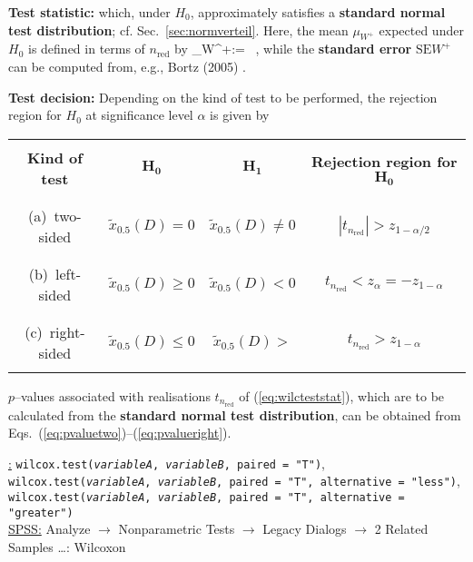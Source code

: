 \medskip
\noindent
\textbf{Test statistic:}
%
\be
{}
\ee
%
which, under $H_{0}$, approximately satisfies a \textbf{standard
normal test distribution}; cf. Sec.~\ref{sec:normverteil}. Here,
the mean $\mu_{W^{+}}$ expected under $H_{0}$ is defined in terms
of $n_\mathrm{red}$ by
%
\be
\mu_{W^{+}}:= \ ,
\ee
%
while the \textbf{standard error} $\text{SE}W^{+}$ can be computed 
from, e.g., Bortz (2005) .

\medskip
\noindent
\textbf{Test decision:} Depending on the kind of test to be 
performed, the rejection region for $H_{0}$ at significance level 
$\alpha$ is given by
%
\begin{center}
\begin{tabular}[h]{c|c|c|c}
 & & & \\
\textbf{Kind of test} & $\boldsymbol{H_{0}}$ &
$\boldsymbol{H_{1}}$ &
\textbf{Rejection region for} $\boldsymbol{H_{0}}$ \\
 & & & \\
\hline
 & & & \\
(a)~two-sided & $\tilde{x}_{0.5}(D) = 0$ & $\tilde{x}_{0.5}(D)
\neq 0$ & $|t_{n_\mathrm{red}}|>z_{1-\alpha/2}$ \\
 & & & \\
\hline
 & & & \\
(b)~left-sided & $\tilde{x}_{0.5}(D) \geq 0$ & $\tilde{x}_{0.5}(D)
< 0$ & $t_{n_\mathrm{red}}<z_{\alpha}=-z_{1-\alpha}$ \\
 & & & \\
\hline
 & & & \\
(c)~right-sided & $\tilde{x}_{0.5}(D) \leq 0$ & $\tilde{x}_{0.5}(D)
> $ & $t_{n_\mathrm{red}}>z_{1-\alpha}$ \\
 & & &
\end{tabular}
\end{center}
%
$p$--values associated with realisations $t_{n_\mathrm{red}}$ of 
(\ref{eq:wilcteststat}), which are to be calculated from the
\textbf{standard normal test distribution}, can be obtained from 
Eqs.~(\ref{eq:pvaluetwo})--(\ref{eq:pvalueright}).

\medskip
\noindent
\underline{\R:}
\texttt{wilcox.test(\textit{variableA}, \textit{variableB},
paired = "T")}, \\
\texttt{wilcox.test(\textit{variableA}, \textit{variableB},
paired = "T", alternative = "less")}, \\
\texttt{wilcox.test(\textit{variableA}, \textit{variableB},
paired = "T", alternative = "greater")} \\
\underline{SPSS:} Analyze $\rightarrow$ Nonparametric Tests
$\rightarrow$ Legacy Dialogs $\rightarrow$ 2 Related
Samples \ldots: Wilcoxon


